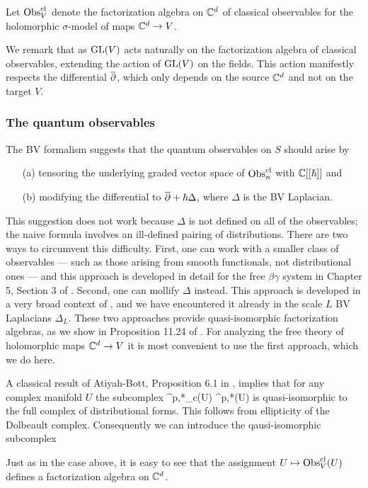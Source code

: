 \begin{dfn}
Let ${\rm Obs}^{\rm cl}_V$ denote the factorization algebra on $\mathbb C^d$ of classical observables for the holomorphic $\sigma$-model of maps $\mathbb C^d \to V$.
\end{dfn}

We remark that as ${\rm GL}(V)$ acts naturally on the factorization algebra of classical observables, extending the action of ${\rm GL}(V)$ on the fields.
This action manifestly respects the differential $\overline{\partial}$, which only depends on the source $\mathbb C^d$ and not on the target $V$. 

\subsubsection{The quantum observables}

The BV formalism suggests that the quantum observables on $S$ should arise by 
\begin{enumerate}
\item[(a)] tensoring the underlying graded vector space of ${\rm Obs}^{\rm cl}_n$ with $\mathbb C[[\hbar]]$ and
\item[(b)] modifying the differential to $\overline{\partial} +\hbar \Delta$, where $\Delta$ is the BV Laplacian.
\end{enumerate}
This suggestion does not work because $\Delta$ is not defined on all of the observables;
the naive formula involves an ill-defined pairing of distributions.
There are two ways to circumvent this difficulty. 
First, one can work with a smaller class of observables --- such as those arising from smooth functionals, not distributional ones --- and this approach is developed in detail for the free $\beta\gamma$ system in Chapter 5, Section 3 of \cite{CG1}. 
Second, one can mollify $\Delta$ instead.
This approach is developed in a very broad context of \cite{CG2}, and we have encountered it already in the scale $L$ BV Laplacians $\Delta_L$.
These two approaches provide quasi-isomorphic factorization algebras, 
as we show in Proposition 11.24 of \cite{GGW}. 
For analyzing the free theory of holomorphic maps $\mathbb C^d \to V$ it is most convenient to use the first approach, which we do here.

A classical result of Atiyah-Bott, Proposition 6.1 in \cite{AB}, implies that for any complex manifold $U$ the subcomplex
\ben
\Omega^{p,*}_c(U) \subset \Bar{\Omega}^{p,*}(U)
\een
is quasi-isomorphic to the full complex of distributional forms. 
This follows from ellipticity of the Dolbeault complex.
Consequently we can introduce the qausi-isomorphic subcomplex 
\ben
{}
\een
Just as in the case above, it is easy to see that the assignment $U \mapsto {\rm Obs}^{{\rm cl}}_V(U)$ defines a factorization algebra on $\mathbb C^d$.

